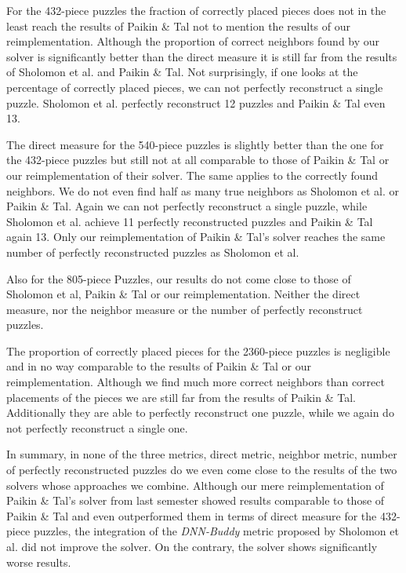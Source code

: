 \documentclass[11pt]{report}
\begin{document}
For the 432-piece puzzles the fraction of correctly placed pieces does not in
the least reach the results of Paikin \& Tal not to mention the results of our
reimplementation. Although the proportion of correct neighbors  found by our
solver is significantly better than the direct measure it is still far from the
results of Sholomon et al. and Paikin \& Tal.
Not surprisingly, if one looks at the percentage of correctly placed pieces, we
can not perfectly reconstruct a single puzzle. Sholomon et al. perfectly
reconstruct 12 puzzles and Paikin \& Tal even 13. 

The direct measure for the 540-piece puzzles is slightly better than the one for
the 432-piece puzzles but still not at all comparable to those of Paikin \& Tal
or our reimplementation of their solver. The same applies to the correctly found
neighbors. We
do not even find half as many true neighbors as Sholomon et al. or Paikin \&
Tal. Again we can not perfectly reconstruct a single puzzle, while Sholomon et
al. achieve 11 perfectly reconstructed puzzles and Paikin \& Tal again 13. Only
our reimplementation of Paikin \& Tal's solver reaches the same number of
perfectly reconstructed puzzles as Sholomon et al.

Also for the 805-piece Puzzles, our results do not come close to those of
Sholomon et al, Paikin \& Tal or our reimplementation. Neither the direct
measure, nor the neighbor measure or the number of perfectly reconstruct
puzzles.

The proportion of correctly placed pieces for the 2360-piece puzzles is
negligible and in no way comparable to the results of Paikin \& Tal or our
reimplementation. Although we find much more correct neighbors than
correct placements of the pieces we are still far from the results of Paikin \&
Tal. Additionally they are able to perfectly reconstruct one puzzle, while we
again do not perfectly reconstruct a single one.

In summary, in none of the three metrics, direct metric, neighbor metric, number
of perfectly reconstructed puzzles do we even come close to the results of the
two solvers whose approaches we combine. Although our mere reimplementation of
Paikin \& Tal's solver from last semester showed results comparable to those of
Paikin \& Tal and even outperformed them in terms of direct measure for the
432-piece puzzles, the integration of the \textit{DNN-Buddy} metric proposed by
Sholomon et al. did not improve the solver. On the contrary, the solver shows
significantly worse results.
\end{document}
